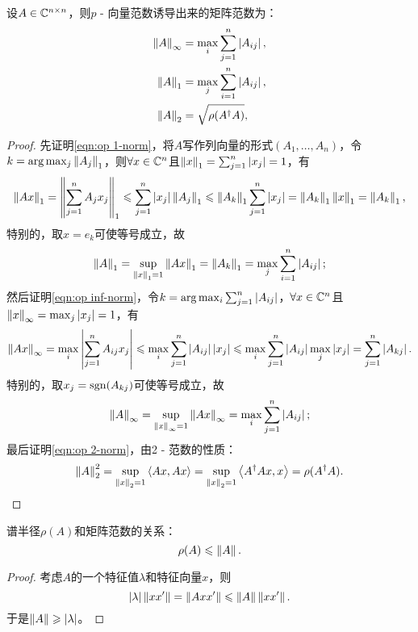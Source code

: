 \begin{example}
    {}{}
    设$A\in\mathbb C^{n\times n}$，则$p$ - 向量范数诱导出来的矩阵范数为：
    \begin{subequations}
        \label{eqn:op norm}
        \begin{align}
            \label{eqn:op inf-norm}
            \left\lVert A\right\rVert_\infty&=\max_{i}\sum_{j=1}^n\left\lvert A_{ij}\right\rvert,\\
            \label{eqn:op 1-norm}
            \left\lVert A\right\rVert_1&=\max_{j}\sum_{i=1}^n\left\lvert A_{ij}\right\rvert,\\
            \label{eqn:op 2-norm}
            \left\lVert A\right\rVert_2&=\sqrt{\rho(A^\dagger A)},
        \end{align}
    \end{subequations}
    \begin{proof}
        先证明\eqref{eqn:op 1-norm}，将$A$写作列向量的形式$(A_1,\ldots,A_n)$，令$k=\arg\max_j\left\lVert A_j\right\rVert_1$，则$\forall x\in\mathbb C^n$且$\left\lVert x\right\rVert_1=\sum_{j=1}^n\left\lvert x_j\right\rvert=1$，有
        \[
            \left\lVert Ax\right\rVert_1=\left\lVert\sum_{j=1}^nA_jx_j\right\rVert_1\leqslant\sum_{j=1}^n\left\lvert x_j\right\rvert\left\lVert A_j\right\rVert_1\leqslant\left\lVert A_k\right\rVert_1\sum_{j=1}^n\left\lvert x_j\right\rvert=\left\lVert A_k\right\rVert_1\left\lVert x\right\rVert_1=\left\lVert A_k\right\rVert_1,
        \]
        特别的，取$x=e_k$可使等号成立，故
        \[
            \left\lVert A\right\rVert_1=\sup_{\left\lVert x\right\rVert_1=1}\left\lVert Ax\right\rVert_1=\left\lVert A_k\right\rVert_1=\max_{j}\sum_{i=1}^n\left\lvert A_{ij}\right\rvert;
        \]
        然后证明\eqref{eqn:op inf-norm}，令$k=\arg\max_i\sum_{j=1}^n\left\lvert A_{ij}\right\rvert$，$\forall x\in\mathbb C^n$且$\left\lVert x\right\rVert_\infty=\max_j\left\lvert x_j\right\rvert=1$，有
        \[
            \left\lVert Ax\right\rVert_\infty=\max_i\left\lvert\sum_{j=1}^nA_{ij}x_j\right\rvert\leqslant\max_i\sum_{j=1}^n\left\lvert A_{ij}\right\rvert\left\lvert x_j\right\rvert\leqslant\max_i\sum_{j=1}^n\left\lvert A_{ij}\right\rvert\max_j\left\lvert x_j\right\rvert=\sum_{j=1}^n\left\lvert A_{kj}\right\rvert.
        \]
        特别的，取$x_j=\operatorname{sgn}(A_{kj})$可使等号成立，故 
        \[
            \left\lVert A\right\rVert_\infty=\sup_{\left\lVert x\right\rVert_\infty=1}\left\lVert Ax\right\rVert_\infty=\max_i\sum_{j=1}^n\left\lvert A_{ij}\right\rvert;
        \]
        最后证明\eqref{eqn:op 2-norm}，由2 - 范数的性质：
        \[
            \left\lVert A\right\rVert_2^2=\sup_{\left\lVert x\right\rVert_2=1}\left\langle Ax,Ax\right\rangle=\sup_{\left\lVert x\right\rVert_2=1}\left\langle A^\dagger Ax,x\right\rangle=\rho(A^\dagger A).
            \qedhere
        \]
    \end{proof}
\end{example}

\begin{theorem}
    {}{}
    谱半径$\rho(A)$和矩阵范数的关系：
    \begin{equation}
        \rho(A)\leqslant\left\lVert A\right\rVert.
    \end{equation}
\end{theorem}

\begin{proof}
    考虑$A$的一个特征值$\lambda$和特征向量$x$，则 
    \[
        \left\lvert\lambda\right\rvert\left\lVert xx'\right\rVert=\left\lVert Axx'\right\rVert\leqslant\left\lVert A\right\rVert\left\lVert xx'\right\rVert.
    \]
    于是$\left\lVert A\right\rVert\geqslant\left\lvert\lambda\right\rvert$。
\end{proof}

